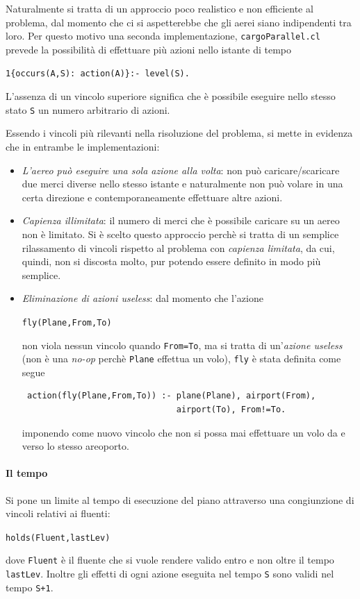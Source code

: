 \documentclass[a4paper,oneside,12pt]{book}
\begin{document}
    Naturalmente si tratta di un approccio poco realistico e non efficiente al problema, dal momento
    che ci si aspetterebbe che gli aerei siano indipendenti tra loro.
    Per questo motivo una seconda implementazione, \texttt{cargoParallel.cl} prevede la possibilità di
    effettuare più azioni nello istante di tempo
    \begin{center}
        \texttt{1\{occurs(A,S): action(A)\}:- level(S).}
    \end{center}
    L'assenza di un vincolo superiore significa che è possibile eseguire nello stesso stato \texttt{S}
    un numero arbitrario di azioni.

    Essendo i vincoli più rilevanti nella risoluzione del problema, si mette in evidenza che in entrambe
    le implementazioni:
    \begin{itemize}
        \item \textit{L'aereo può eseguire una sola azione alla volta}: non può caricare/scaricare due
        merci diverse nello stesso istante e naturalmente non può volare in una certa direzione e
        contemporaneamente effettuare altre azioni.
        \item \textit{Capienza illimitata}: il numero di merci che è possibile caricare su un aereo
        non è limitato.
        Si è scelto questo approccio perchè si tratta di un semplice rilassamento di vincoli rispetto al
        problema con \textit{capienza limitata}, da cui, quindi, non si discosta molto, pur potendo essere
        definito in modo più semplice.
        \item \textit{Eliminazione di azioni useless}: dal momento che l'azione
        \begin{center}
            \texttt{fly(Plane,From,To)}
        \end{center}
        non viola nessun vincolo quando \texttt{From=To}, ma si tratta di un'\textit{azione useless} (non è una
        \textit{no-op} perchè \texttt{Plane} effettua un volo), \texttt{fly} è stata definita come segue
        \begin{verbatim} action(fly(Plane,From,To)) :- plane(Plane), airport(From),
                               airport(To), From!=To.
        \end{verbatim}
        imponendo come nuovo vincolo che non si possa mai effettuare un volo da e verso lo stesso areoporto.
    \end{itemize}

    \paragraph*{Il tempo\\}
    Si pone un limite al tempo di esecuzione del piano attraverso una congiunzione di vincoli relativi ai fluenti:
        \begin{center}
            \texttt{holds(Fluent,lastLev)}
        \end{center}
    dove \texttt{Fluent} è il fluente che si vuole rendere valido entro e non oltre il tempo \texttt{lastLev}.
    Inoltre gli effetti di ogni azione eseguita nel tempo \texttt{S} sono validi nel tempo \texttt{S+1}.
\end{document}
